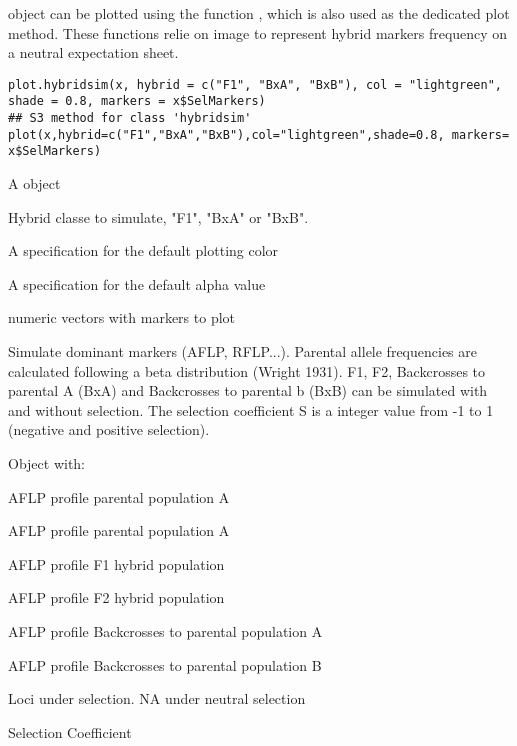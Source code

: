 \documentclass[letterpaper]{book}
\begin{document}
%
\begin{Description}\relax
{} object can be plotted using the function , which is also used as the dedicated plot method. These functions relie on image to represent hybrid markers frequency on a neutral expectation sheet.
\end{Description}
%
\begin{Usage}
\begin{verbatim}
plot.hybridsim(x, hybrid = c("F1", "BxA", "BxB"), col = "lightgreen", shade = 0.8, markers = x$SelMarkers) 
## S3 method for class 'hybridsim'
plot(x,hybrid=c("F1","BxA","BxB"),col="lightgreen",shade=0.8, markers= x$SelMarkers)
\end{verbatim}
\end{Usage}
%
\begin{Arguments}
\begin{ldescription}
\item[\code{x}] 
A  object

\item[\code{hybrid}] 
Hybrid classe to simulate, "F1", "BxA" or "BxB".

\item[\code{col}] 
A specification for the default plotting color

\item[\code{shade}] 
A specification for the default alpha value

\item[\code{markers}] 
numeric vectors with markers to plot


\end{ldescription}
\end{Arguments}
%
\begin{Details}\relax
Simulate dominant markers (AFLP, RFLP...). Parental allele frequencies are calculated following a beta distribution (Wright 1931).
F1, F2, Backcrosses to parental A (BxA) and Backcrosses to parental b (BxB) can be simulated with and without selection. The selection coefficient S is a integer value from -1 to 1 (negative and positive selection).  
\end{Details}
%
\begin{Value}
Object   with:
\begin{ldescription}
\item[\code{PA }] AFLP profile parental population A
\item[\code{PB }] AFLP profile parental population A
\item[\code{F1}] AFLP profile F1 hybrid population
\item[\code{F2}] AFLP profile F2 hybrid population
\item[\code{BxA}] AFLP profile Backcrosses to parental population A
\item[\code{BxB}] AFLP profile Backcrosses to parental population B
\item[\code{Nsel}] Loci under selection. NA under neutral selection
\item[\code{S}] Selection Coefficient
\end{ldescription}
\end{Value}
\end{document}
